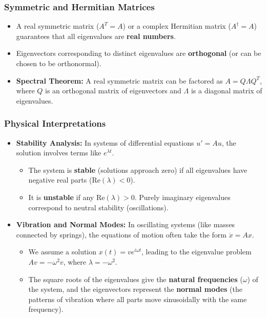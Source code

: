 \documentclass{article}
\begin{document}
\subsubsection{Symmetric and Hermitian Matrices}
\begin{itemize}
    \item A real symmetric matrix ($A^T = A$) or a complex Hermitian matrix ($A^\dagger = A$) guarantees that all eigenvalues are \textbf{real numbers}.
    \item Eigenvectors corresponding to distinct eigenvalues are \textbf{orthogonal} (or can be chosen to be orthonormal).
    \item \textbf{Spectral Theorem:} A real symmetric matrix can be factored as $A = Q\Lambda Q^T$, where $Q$ is an orthogonal matrix of eigenvectors and $\Lambda$ is a diagonal matrix of eigenvalues.
\end{itemize}

\subsubsection{Physical Interpretations}
\begin{itemize}
    \item \textbf{Stability Analysis:} In systems of differential equations $u' = Au$, the solution involves terms like $e^{\lambda t}$.
    \begin{itemize}
        \item The system is \textbf{stable} (solutions approach zero) if all eigenvalues have negative real parts ($\text{Re}(\lambda) < 0$).
        \item It is \textbf{unstable} if any $\text{Re}(\lambda) > 0$. Purely imaginary eigenvalues correspond to neutral stability (oscillations).
    \end{itemize}
    \item \textbf{Vibration and Normal Modes:} In oscillating systems (like masses connected by springs), the equations of motion often take the form $\ddot{x} = Ax$.
    \begin{itemize}
        \item We assume a solution $x(t) = v e^{i\omega t}$, leading to the eigenvalue problem $Av = -\omega^2 v$, where $\lambda = -\omega^2$.
        \item The square roots of the eigenvalues give the \textbf{natural frequencies} ($\omega$) of the system, and the eigenvectors represent the \textbf{normal modes} (the patterns of vibration where all parts move sinusoidally with the same frequency).
    \end{itemize}
\end{itemize}
\end{document}

